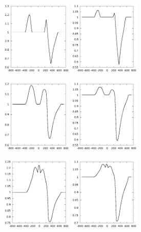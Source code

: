 \documentclass{article}
\begin{document}
\begin{figure}
	\centering
	\includegraphics[width=0.3\textwidth]{profHa3accr03045}
	\includegraphics[width=0.3\textwidth]{profHb3accr03045}

	\includegraphics[width=0.3\textwidth]{profHa3accr303045}
	\includegraphics[width=0.3\textwidth]{profHb3accr303045}

	\includegraphics[width=0.3\textwidth]{profHa3accr453045}
	\includegraphics[width=0.3\textwidth]{profHb3accr453045}


\end{figure}
\end{document}
